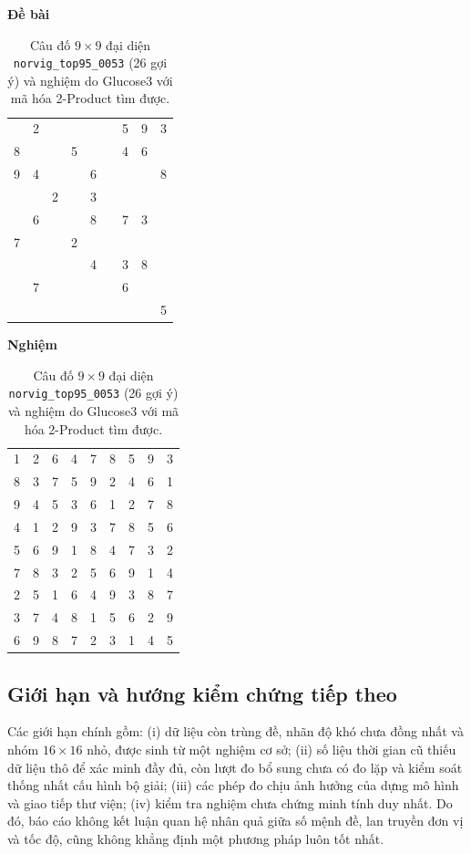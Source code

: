 \documentclass[a4paper,fleqn,nologo]{cas-sc}
\begin{document}
\begin{table}[pos=!htbp]
\centering
\small
\caption{Câu đố $9\times9$ đại diện \texttt{norvig\_top95\_0053} (26 gợi ý) và nghiệm do Glucose3 với mã hóa 2-Product tìm được.}
\label{tab:case_grid}
\begin{minipage}{0.48\linewidth}\centering
\textbf{Đề bài}\\[4pt]
\begin{tabular}{|ccc|ccc|ccc|}
\hline
 & 2 & & & & & 5 & 9 & 3 \\
8 & & & 5 & & & 4 & 6 & \\
9 & 4 & & & 6 & & & & 8 \\
\hline
 & & 2 & & 3 & & & & \\
 & 6 & & & 8 & & 7 & 3 & \\
7 & & & 2 & & & & & \\
\hline
 & & & & 4 & & 3 & 8 & \\
 & 7 & & & & & 6 & & \\
 & & & & & & & & 5 \\
\hline
\end{tabular}
\end{minipage}\hfill
\begin{minipage}{0.48\linewidth}\centering
\textbf{Nghiệm}\\[4pt]
\begin{tabular}{|ccc|ccc|ccc|}
\hline
1 & 2 & 6 & 4 & 7 & 8 & 5 & 9 & 3 \\
8 & 3 & 7 & 5 & 9 & 2 & 4 & 6 & 1 \\
9 & 4 & 5 & 3 & 6 & 1 & 2 & 7 & 8 \\
\hline
4 & 1 & 2 & 9 & 3 & 7 & 8 & 5 & 6 \\
5 & 6 & 9 & 1 & 8 & 4 & 7 & 3 & 2 \\
7 & 8 & 3 & 2 & 5 & 6 & 9 & 1 & 4 \\
\hline
2 & 5 & 1 & 6 & 4 & 9 & 3 & 8 & 7 \\
3 & 7 & 4 & 8 & 1 & 5 & 6 & 2 & 9 \\
6 & 9 & 8 & 7 & 2 & 3 & 1 & 4 & 5 \\
\hline
\end{tabular}
\end{minipage}
\end{table}

\subsection*{Giới hạn và hướng kiểm chứng tiếp theo}
Các giới hạn chính gồm: (i) dữ liệu còn trùng đề, nhãn độ khó chưa đồng nhất và nhóm $16\times16$ nhỏ, được sinh từ một nghiệm cơ sở; (ii) số liệu thời gian cũ thiếu dữ liệu thô để xác minh đầy đủ, còn lượt đo bổ sung chưa có đo lặp và kiểm soát thống nhất cấu hình bộ giải; (iii) các phép đo chịu ảnh hưởng của dựng mô hình và giao tiếp thư viện; (iv) kiểm tra nghiệm chưa chứng minh tính duy nhất. Do đó, báo cáo không kết luận quan hệ nhân quả giữa số mệnh đề, lan truyền đơn vị và tốc độ, cũng không khẳng định một phương pháp luôn tốt nhất.
\end{document}
